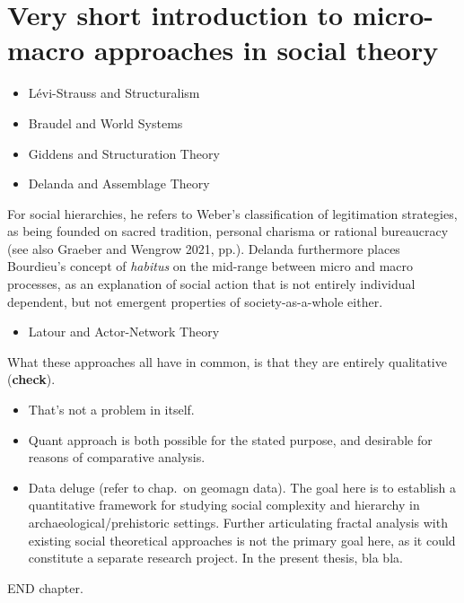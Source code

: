 \documentclass[
  12pt,
  a4paper, twoside]{book}
\providecommand{\tightlist}{%
  \setlength{\itemsep}{0pt}\setlength{\parskip}{0pt}}
\begin{document}
\hypertarget{very-short-introduction-to-micro-macro-approaches-in-social-theory}{%
\section{Very short introduction to micro-macro approaches in social theory}\label{very-short-introduction-to-micro-macro-approaches-in-social-theory}}

\begin{itemize}
\item
  Lévi-Strauss and Structuralism
\item
  Braudel and World Systems
\item
  Giddens and Structuration Theory
\item
  Delanda and Assemblage Theory
\end{itemize}

For social hierarchies, he refers to Weber's classification of legitimation strategies, as being founded on sacred tradition, personal charisma or rational bureaucracy (see also Graeber and Wengrow 2021, pp.). Delanda furthermore places Bourdieu's concept of \emph{habitus} on the mid-range between micro and macro processes, as an explanation of social action that is not entirely individual dependent, but not emergent properties of society-as-a-whole either.

\begin{itemize}
\tightlist
\item
  Latour and Actor-Network Theory
\end{itemize}

What these approaches all have in common, is that they are entirely qualitative (\textbf{check}).

\begin{itemize}
\item
  That's not a problem in itself.
\item
  Quant approach is both possible for the stated purpose, and desirable for reasons of comparative analysis.
\item
  Data deluge (refer to chap.~on geomagn data). The goal here is to establish a quantitative framework for studying social complexity and hierarchy in archaeological/prehistoric settings. Further articulating fractal analysis with existing social theoretical approaches is not the primary goal here, as it could constitute a separate research project. In the present thesis, bla bla.
\end{itemize}

END chapter.
\end{document}
